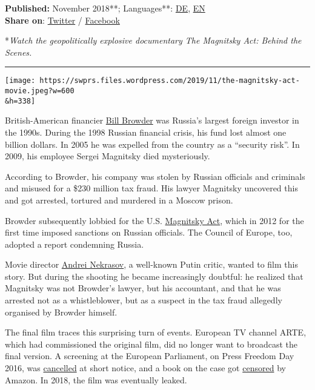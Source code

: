 \textbf{Published:} November 2018**; Languages**:
\href{https://swprs.org/der-fall-magnitsky/}{DE},
\href{https://swprs.org/the-magnitsky-act/}{EN}\\
\textbf{Share on}:
\href{https://twitter.com/intent/tweet?url=https://swprs.org/the-magnitsky-act/}{Twitter}
/
\href{https://www.facebook.com/share.php?u=https://swprs.org/the-magnitsky-act/}{Facebook}

*\emph{Watch the geopolitically explosive documentary The Magnitsky Act:
Behind the Scenes.}

\begin{center}\rule{0.5\linewidth}{\linethickness}\end{center}

\texttt{[image: https://swprs.files.wordpress.com/2019/11/the-magnitsky-act-movie.jpeg?w=600\\\&h=338]}

British-American financier
\href{https://en.wikipedia.org/wiki/Bill_Browder}{Bill Browder} was
Russia's largest foreign investor in the 1990s. During the 1998 Russian
financial crisis, his fund lost almost one billion dollars. In 2005 he
was expelled from the country as a ``security risk''. In 2009, his
employee Sergei Magnitsky died mysteriously.

According to Browder, his company was stolen by Russian officials and
criminals and misused for a \$230 million tax fraud. His lawyer
Magnitsky uncovered this and got arrested, tortured and murdered in a
Moscow prison.

Browder subsequently lobbied for the U.S.
\href{https://en.wikipedia.org/wiki/Magnitsky_Act}{Magnitsky Act}, which
in 2012 for the first time imposed sanctions on Russian officials. The
Council of Europe, too, adopted a report condemning Russia.

Movie director
\href{https://en.wikipedia.org/wiki/Andrei_Nekrasov}{Andrei Nekrasov}, a
well-known Putin critic, wanted to film this story. But during the
shooting he became increasingly doubtful: he realized that Magnitsky was
not Browder's lawyer, but his accountant, and that he was arrested not
as a whistleblower, but as a suspect in the tax fraud allegedly
organised by Browder himself.

The final film traces this surprising turn of events. European TV
channel ARTE, which had commissioned the original film, did no longer
want to broadcast the final version. A screening at the European
Parliament, on Press Freedom Day 2016, was
\href{https://consortiumnews.com/2016/06/21/destroying-the-magnitsky-myth/}{cancelled}
at short notice, and a book on the case got
\href{https://thesaker.is/how-my-book-unmasking-bill-browder-was-censored-by-amazon-by-alex-krainer/}{censored}
by Amazon. In 2018, the film was eventually leaked.


